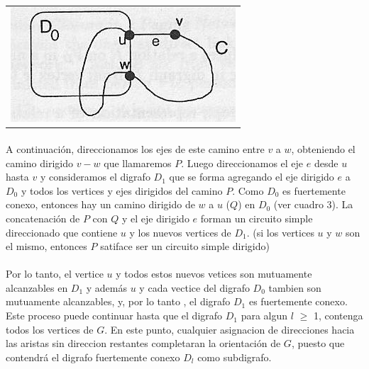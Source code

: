 	\begin{table}[h!] %
		\centering %
			\begin{tabular}{c}
				\includegraphics[scale=0.7]{./otros/figura2.jpg} 

				\end{tabular}
				\caption{} %
				\label{} %
	\end{table}

\paragraph{}
A continuación, direccionamos los ejes de este camino entre $v$ a $w$, obteniendo el camino dirigido $v-w$ que llamaremos $P$. Luego direccionamos el eje $e$ desde $u$ hasta $v$ y consideramos el digrafo $D_1$ que se forma agregando el eje dirigido $e$ a $D_0$ y todos los vertices y ejes dirigidos del camino $P$. Como $D_0$ es fuertemente conexo, entonces hay un camino dirigido de $w$ a $u$ ($Q$) en $D_0$ (ver cuadro 3). La concatenación de $P$ con $Q$ y el eje dirigido $e$ forman un circuito simple direccionado que contiene $u$ y los nuevos vertices de $D_1$. (si los vertices $u$ y $w$ son el mismo, entonces $P$ satiface ser un circuito simple dirigido)



\paragraph{}
Por lo tanto, el vertice $u$ y todos estos nuevos vetices son mutuamente alcanzables en $D_1$ y además $u$ y cada vectice del digrafo $D_0$ tambien son mutuamente alcanzables, y, por lo tanto , el digrafo $D_1$ es fuertemente conexo. Este proceso puede continuar hasta que el digrafo $D_1$ para algun $l$ $\geq$ 1, contenga todos los vertices de $G$. En este punto, cualquier asignacion de direcciones hacia las aristas sin direccion restantes completaran la orientación de $G$, puesto que contendrá el digrafo fuertemente conexo $D_l$ como subdigrafo.


